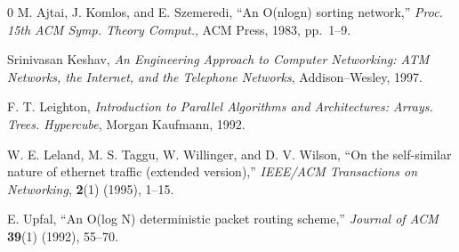 \documentclass{ws-join}
\begin{document}
\begin{thebibliography}{0}
 M. Ajtai, J. Komlos, and E. Szemeredi, ``An O(nlogn) 
sorting network,'' {\it Proc. 15th ACM Symp. Theory Comput.},  
ACM Press, 1983, pp.~1--9. 

 Srinivasan Keshav, {\it An Engineering Approach to 
Computer Networking: ATM Networks, the Internet, and the 
Telephone Networks}, Addison--Wesley, 1997.

 F. T. Leighton, {\it Introduction to Parallel 
Algorithms and Architectures: Arrays. Trees. Hypercube},  
Morgan Kaufmann, 1992.

 W. E. Leland, M. S. Taggu, W. Willinger, and D. V. Wilson, 
``On the self-similar nature of ethernet traffic (extended version),''  
{\it IEEE/ACM Transactions on Networking}, {\bf 2}(1) (1995), 1--15.

 E. Upfal, ``An O(log N) deterministic packet routing scheme,''  
{\it Journal of ACM} {\bf 39}(1) (1992), 55--70.
\end{thebibliography}
\end{document}
